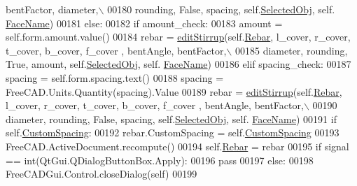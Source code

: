 \begin{DoxyCode}
      bentFactor, diameter,\(\backslash\)
00180                     rounding, \textcolor{keyword}{False}, spacing, self.\hyperlink{classStirrup_1_1__StirrupTaskPanel_a25d8b984bd2817ec46c1375b6bec647d}{SelectedObj}, self.
      \hyperlink{classStirrup_1_1__StirrupTaskPanel_a8c01c4e8108c6aaad15394072b188730}{FaceName})
00181         \textcolor{keywordflow}{else}:
00182             \textcolor{keywordflow}{if} amount\_check:
00183                 amount = self.form.amount.value()
00184                 rebar = \hyperlink{namespaceStirrup_a1f6d278ace7fe116895dba342e2a3573}{editStirrup}(self.\hyperlink{classStirrup_1_1__StirrupTaskPanel_a004a341f992f38ca54893edf92f85faa}{Rebar}, l\_cover, r\_cover, t\_cover, b\_cover, f\_cover
      , bentAngle, bentFactor,\(\backslash\)
00185                     diameter, rounding, \textcolor{keyword}{True}, amount, self.\hyperlink{classStirrup_1_1__StirrupTaskPanel_a25d8b984bd2817ec46c1375b6bec647d}{SelectedObj}, self.
      \hyperlink{classStirrup_1_1__StirrupTaskPanel_a8c01c4e8108c6aaad15394072b188730}{FaceName})
00186             \textcolor{keywordflow}{elif} spacing\_check:
00187                 spacing = self.form.spacing.text()
00188                 spacing = FreeCAD.Units.Quantity(spacing).Value
00189                 rebar = \hyperlink{namespaceStirrup_a1f6d278ace7fe116895dba342e2a3573}{editStirrup}(self.\hyperlink{classStirrup_1_1__StirrupTaskPanel_a004a341f992f38ca54893edf92f85faa}{Rebar}, l\_cover, r\_cover, t\_cover, b\_cover, f\_cover
      , bentAngle, bentFactor,\(\backslash\)
00190                     diameter, rounding, \textcolor{keyword}{False}, spacing, self.\hyperlink{classStirrup_1_1__StirrupTaskPanel_a25d8b984bd2817ec46c1375b6bec647d}{SelectedObj}, self.
      \hyperlink{classStirrup_1_1__StirrupTaskPanel_a8c01c4e8108c6aaad15394072b188730}{FaceName})
00191         \textcolor{keywordflow}{if} self.\hyperlink{classStirrup_1_1__StirrupTaskPanel_a88a444f6e236ba21c053f1a6540dd640}{CustomSpacing}:
00192             rebar.CustomSpacing = self.\hyperlink{classStirrup_1_1__StirrupTaskPanel_a88a444f6e236ba21c053f1a6540dd640}{CustomSpacing}
00193             FreeCAD.ActiveDocument.recompute()
00194         self.\hyperlink{classStirrup_1_1__StirrupTaskPanel_a004a341f992f38ca54893edf92f85faa}{Rebar} = rebar
00195         \textcolor{keywordflow}{if} signal == int(QtGui.QDialogButtonBox.Apply):
00196             \textcolor{keywordflow}{pass}
00197         \textcolor{keywordflow}{else}:
00198             FreeCADGui.Control.closeDialog(self)
00199 
\end{DoxyCode}


